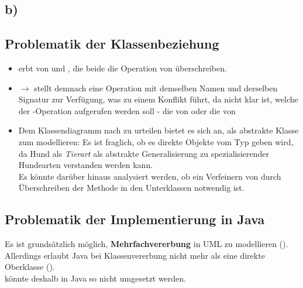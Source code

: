 \subsection*{b)}

\subsection*{Problematik der Klassenbeziehung}
\begin{itemize}
    \item {} erbt von  und , die beide die Operation  von  überschreiben.
    \item[] $\rightarrow$  stellt demnach eine Operation mit demselben Namen und derselben Signatur zur Verfügung, was zu einem Konflikt führt, da nicht klar ist, welche der -Operation aufgerufen werden soll - die von  oder die von 
    \item Dem Klassendiagramm nach zu urteilen bietet es sich an,  als abstrakte Klasse zum modellieren: Es ist fraglich, ob es direkte Objekte vom Typ  geben wird, da Hund als \textit{Tierart} als abstrakte Generalisierung zu spezialisierender Hundearten verstanden werden kann.\\
    Es könnte darüber hinaus analysiert werden, ob ein Verfeinern von  durch Überschreiben der Methode  in den Unterklassen notwendig ist.
\end{itemize}

\subsection*{Problematik der Implementierung in Java}
Es ist grundsätzlich möglich, \textbf{Mehrfachvererbung} in UML zu modellieren (\cite[300]{Bal05}).\\
Allerdings erlaubt Java bei Klassenvererbung nicht mehr als eine direkte Oberklasse (\cite[526]{Ull23}).\\
 könnte deshalb in Java so nicht umgesetzt werden.